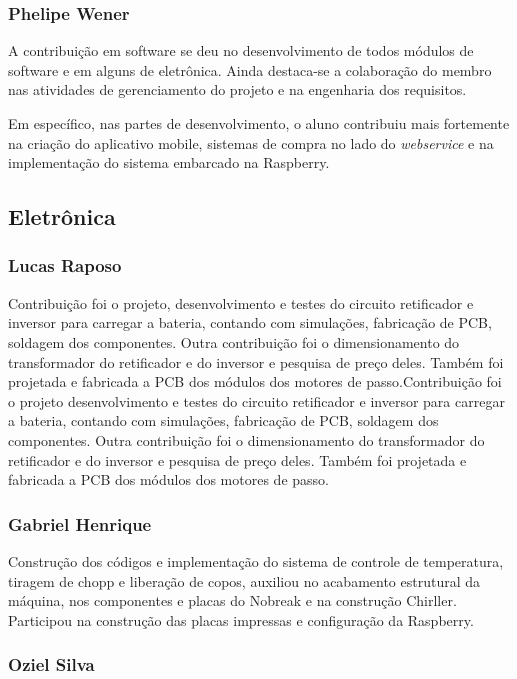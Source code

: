 \begin{apendicesenv}
\subsubsection{Phelipe Wener}

A contribuição em software se deu no desenvolvimento de todos módulos de software e em alguns de eletrônica. Ainda destaca-se a colaboração do membro nas atividades de gerenciamento do projeto e na engenharia dos requisitos.

Em específico, nas partes de desenvolvimento, o aluno contribuiu mais fortemente na criação do aplicativo mobile, sistemas de compra no lado do \textit{webservice} e na implementação do sistema embarcado na Raspberry.

\subsection{Eletrônica}

\subsubsection{Lucas Raposo}

Contribuição foi o projeto, desenvolvimento e testes do circuito retificador
e inversor para carregar a bateria, contando com simulações, fabricação de PCB,
soldagem dos componentes. Outra contribuição foi o dimensionamento do transformador 
do retificador e do inversor e pesquisa de preço deles. Também foi projetada e fabricada
a PCB dos módulos dos motores de passo.Contribuição foi o projeto desenvolvimento
e testes do circuito retificador e inversor para carregar a bateria, contando com simulações, 
fabricação de PCB, soldagem dos componentes. Outra contribuição foi o dimensionamento
do transformador do retificador e do inversor e pesquisa de preço deles. Também foi projetada
e fabricada a PCB dos módulos dos motores de passo.

\subsubsection{Gabriel Henrique}

Construção dos códigos e implementação do sistema de controle de temperatura,
tiragem de chopp e liberação de copos, auxiliou no acabamento estrutural da máquina,
nos componentes e placas do Nobreak e na construção Chirller. Participou na construção
das placas impressas e configuração da Raspberry.

\subsubsection{Oziel Silva}


\end{apendicesenv}
